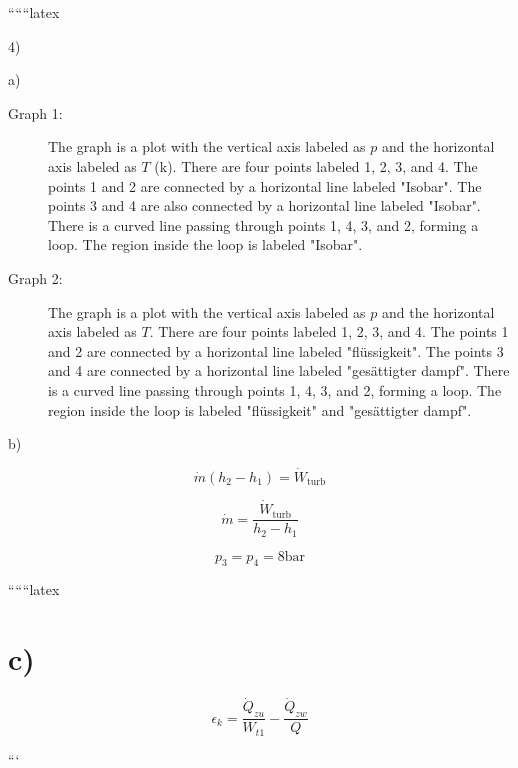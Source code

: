 
``````latex


4)

a)

\begin{description}
    \item[Graph 1:] The graph is a plot with the vertical axis labeled as \( p \) and the horizontal axis labeled as \( T \) (k). There are four points labeled 1, 2, 3, and 4. The points 1 and 2 are connected by a horizontal line labeled "Isobar". The points 3 and 4 are also connected by a horizontal line labeled "Isobar". There is a curved line passing through points 1, 4, 3, and 2, forming a loop. The region inside the loop is labeled "Isobar".
\end{description}

\begin{description}
    \item[Graph 2:] The graph is a plot with the vertical axis labeled as \( p \) and the horizontal axis labeled as \( T \). There are four points labeled 1, 2, 3, and 4. The points 1 and 2 are connected by a horizontal line labeled "flüssigkeit". The points 3 and 4 are connected by a horizontal line labeled "gesättigter dampf". There is a curved line passing through points 1, 4, 3, and 2, forming a loop. The region inside the loop is labeled "flüssigkeit" and "gesättigter dampf".
\end{description}

b)

\[
\dot{m}(h_2 - h_1) = \dot{W}_{\text{turb}}
\]

\[
\dot{m} = \frac{\dot{W}_{\text{turb}}}{h_2 - h_1}
\]

\[
p_3 = p_4 = 8 \text{bar}
\]

``````latex

\section*{c)}

\begin{equation*}
\epsilon_k = \frac{\dot{Q}_{zu}}{W_{t1}} - \frac{\dot{Q}_{zw}}{Q}
\end{equation*}

```